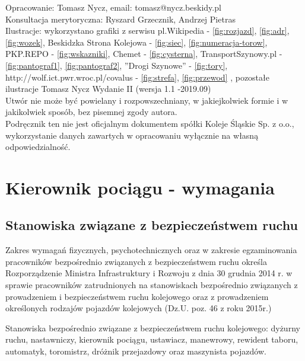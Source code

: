 \documentclass[usenames,dvipsnames,svgnames,table,a4paper,openany,justified]{tufte-book}
\begin{document}
Opracowanie: Tomasz Nycz, email: tomasz@nycz.beskidy.pl\\
Konsultacja merytoryczna: Ryszard Grzecznik, Andrzej Pietras\\
Ilustracje: wykorzystano grafiki z serwisu pl.Wikipedia - \ref{fig:rozjazd}, \ref{fig:adr}, \ref{fig:wozek}, Beskidzka Strona Kolejowa  - \ref{fig:siec}, \ref{fig:numeracja-torow}, PKP.REPO - \ref{fig:wskazniki}, Chemet - \ref{fig:cysterna}, TransportSzynowy.pl - \ref{fig:pantograf1}, \ref{fig:pantograf2}, ''Drogi Szynowe'' - \ref{fig:tory}, http://wolf.ict.pwr.wroc.pl/covalus - \ref{fig:strefa}, \ref{fig:przewod} , pozostałe ilustracje Tomasz Nycz
\vfill
Wydanie II (wersja 1.1 -2019.09)\\
Utwór nie może być powielany i rozpowszechniany, w jakiejkolwiek formie
i w jakikolwiek sposób, bez pisemnej zgody autora.  
\\Podręcznik ten nie jest oficjalnym dokumentem spółki Koleje Śląskie Sp. z o.o., wykorzystanie danych zawartych w opracowaniu wyłącznie na własną odpowiedzialność. 

\part{Kierownik pociągu - wymagania}
\chapter{Stanowiska związane z bezpieczeństwem ruchu}
Zakres wymagań fizycznych, psychotechnicznych oraz w zakresie egzaminowania pracowników bezpośrednio związanych z bezpieczeństwem ruchu określa Rozporządzenie Ministra Infrastruktury i Rozwoju z dnia 30 grudnia 2014 r. w sprawie pracowników zatrudnionych na stanowiskach bezpośrednio związanych z prowadzeniem i bezpieczeństwem ruchu kolejowego oraz z prowadzeniem określonych rodzajów pojazdów kolejowych (Dz.U. poz. 46 z roku 2015r.)

Stanowiska bezpośrednio związane z bezpieczeństwem ruchu kolejowego: dyżurny ruchu, nastawniczy, kierownik pociągu, ustawiacz, manewrowy, rewident taboru, automatyk, toromistrz, dróżnik przejazdowy oraz maszynista pojazdów.
\end{document}
